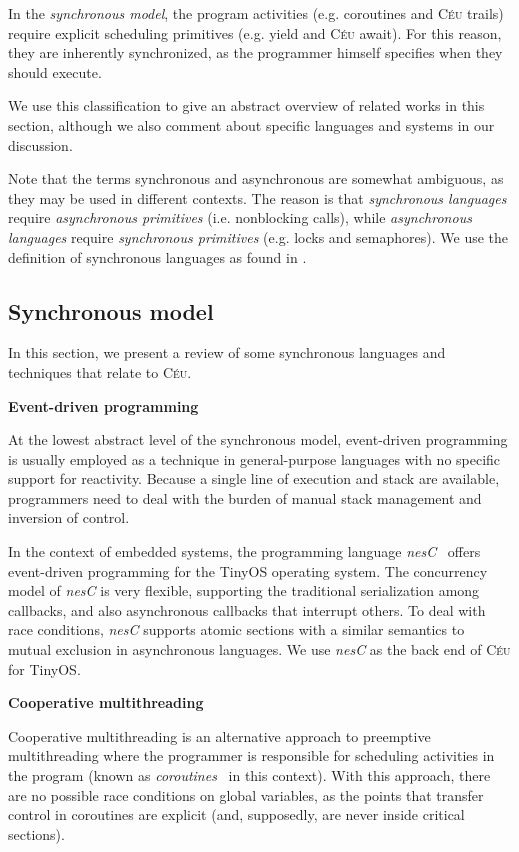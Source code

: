 \documentclass[11pt,a4paper]{article}
\newcommand{\2}{\;\;}
\newcommand{\5}{\;\;\;\;\;}
\newcommand{\CEU}{\textsc{C\'{e}u}}
\newcommand{\nesc}{\emph{nesC}}
\begin{document}
In the \emph{synchronous model}, the program activities (e.g. coroutines and 
\CEU{} trails) require explicit scheduling primitives (e.g. yield and \CEU{} 
await).
For this reason, they are inherently synchronized, as the programmer himself 
specifies when they should execute.

We use this classification to give an abstract overview of related works in 
this section, although we also comment about specific languages and systems in 
our discussion.

Note that the terms synchronous and asynchronous are somewhat ambiguous, as 
they may be used in different contexts.
The reason is that \emph{synchronous languages} require \emph{asynchronous 
primitives} (i.e. nonblocking calls), while \emph{asynchronous languages} 
require \emph{synchronous primitives} (e.g. locks and semaphores).
We use the definition of synchronous languages as found in 
\cite{rp.twelve,rp.hypothesis}.

\subsection{Synchronous model}

In this section, we present a review of some synchronous languages and 
techniques that relate to \CEU.

\textbf{Event-driven programming}

At the lowest abstract level of the synchronous model, event-driven programming 
is usually employed as a technique in general-purpose languages with no 
specific support for reactivity.
Because a single line of execution and stack are available, programmers need to 
deal with the burden of manual stack management and inversion of 
control.~\cite{sync_async.cooperative}

In the context of embedded systems, the programming language 
\nesc{}~\cite{wsn.nesc} offers event-driven programming for the TinyOS 
operating system.
The concurrency model of \nesc{} is very flexible, supporting the traditional 
serialization among callbacks, and also asynchronous callbacks that interrupt 
others.
To deal with race conditions, \nesc{} supports atomic sections with a similar 
semantics to mutual exclusion in asynchronous languages.
We use \nesc{} as the back end of \CEU{} for TinyOS.

\textbf{Cooperative multithreading}

Cooperative multithreading is an alternative approach to preemptive 
multithreading where the programmer is responsible for scheduling activities in 
the program (known as \emph{coroutines}~\cite{lua.coroutines} in this context).
With this approach, there are no possible race conditions on global variables, 
as the points that transfer control in coroutines are explicit (and, 
supposedly, are never inside critical sections).
\end{document}
